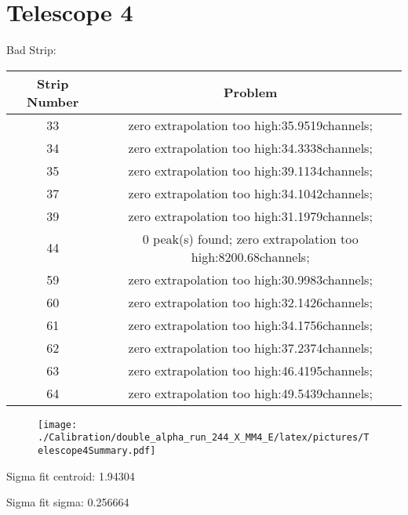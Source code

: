 \documentclass[a4paper,6pt]{article}
\begin{document}
\section{Telescope 4 }
 Bad Strip:
\begin{center}
\begin{tabular}{ | c | c | } 
\hline 
 Strip Number & Problem \\ \hline 
33 &  zero extrapolation too high:35.9519channels;  \\ \hline 
34 &  zero extrapolation too high:34.3338channels;  \\ \hline 
35 &  zero extrapolation too high:39.1134channels;  \\ \hline 
37 &  zero extrapolation too high:34.1042channels;  \\ \hline 
39 &  zero extrapolation too high:31.1979channels;  \\ \hline 
44 &  0 peak(s) found; zero extrapolation too high:8200.68channels;  \\ \hline 
59 &  zero extrapolation too high:30.9983channels;  \\ \hline 
60 &  zero extrapolation too high:32.1426channels;  \\ \hline 
61 &  zero extrapolation too high:34.1756channels;  \\ \hline 
62 &  zero extrapolation too high:37.2374channels;  \\ \hline 
63 &  zero extrapolation too high:46.4195channels;  \\ \hline 
64 &  zero extrapolation too high:49.5439channels;  \\ \hline 
\end{tabular} 
\end{center}
\begin{figure}[htcb!]
\begin{center}
\texttt{[image: ./Calibration/double\_alpha\_run\_244\_X\_MM4\_E/latex/pictures/Telescope4Summary.pdf]}
\end{center}
\end{figure}
\pagebreak
Sigma fit centroid: 1.94304

Sigma fit sigma: 0.256664
\end{document}
